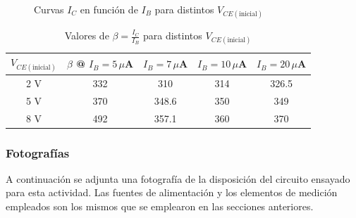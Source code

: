 \documentclass[chaptersright]{informeutn}
\begin{document}
    \begin{figure}[H]
      \centering
      \caption{Curvas $I_C$ en función de $I_B$ para distintos $V_{CE(\text{inicial})}$}
    \end{figure}

    \begin{table}[H]
      \centering
      \begin{tabular}{|c|c|c|c|c|}
      \hline
      $V_{CE(\text{inicial})}$ & $\beta$ @ $I_B=5\,\mu$A & $I_B=7\,\mu$A & $I_B=10\,\mu$A & $I_B=20\,\mu$A \\
      \hline
      2 V  & 332   & 310    & 314   & 326.5 \\
      5 V  & 370   & 348.6  & 350   & 349   \\
      8 V  & 492   & 357.1  & 360   & 370   \\
      \hline
      \end{tabular}
      \caption{Valores de $\beta = \frac{I_C}{I_B}$ para distintos $V_{CE(\text{inicial})}$}
    \end{table}

   \subsubsection{Fotografías}
    A continuación se adjunta una fotografía de la disposición del circuito
    ensayado para esta actividad. Las fuentes de alimentación y los elementos
    de medición empleados son los mismos que se emplearon en las secciones
    anteriores.
\end{document}
